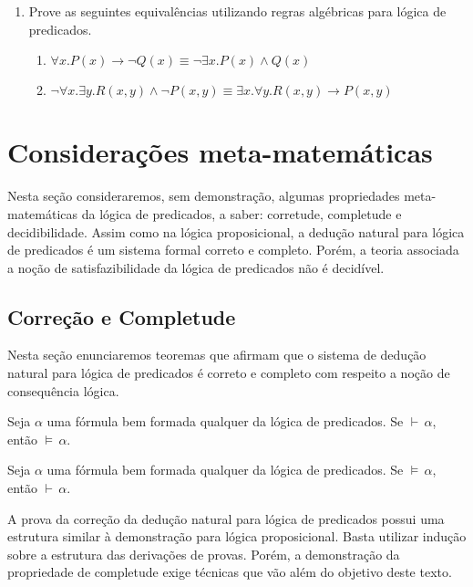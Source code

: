 \begin{enumerate}
         \item Prove as seguintes equival\^encias utilizando regras alg\'ebricas para l\'ogica de predicados.
         \begin{enumerate}
            \item $\forall x. P(x) \rightarrow \neg Q(x) \equiv \neg \exists x. P(x) \land Q(x)$
            \item $\neg \forall x.\exists y. R(x,y)\land \neg P(x,y)\equiv\exists x.\forall y.R(x,y)\rightarrow P(x,y)$
         \end{enumerate}
\end{enumerate}

\section{Considerações meta-matemáticas}

Nesta seção consideraremos, sem demonstração, algumas propriedades
meta-matemáticas da lógica de predicados, a saber: corretude,
completude e decidibilidade. Assim como na lógica proposicional, a
dedução natural para lógica de predicados é um sistema formal correto
e completo. Porém, a teoria associada a noção de satisfazibilidade da
lógica de predicados não é decidível.

\subsection{Correção e Completude}

Nesta seção enunciaremos teoremas que afirmam que o sistema de dedução
natural para lógica de predicados é correto e completo com respeito a
noção de consequência lógica.

\begin{Theorem}
Seja $\alpha$ uma fórmula bem formada qualquer da lógica
de predicados. Se $\vdash\,\alpha$, então $\models\,\alpha$.
\end{Theorem}

\begin{Theorem}
Seja $\alpha$ uma fórmula bem formada qualquer da lógica
de predicados. Se $\models\,\alpha$, então $\vdash\,\alpha$.
\end{Theorem}

A prova da correção da dedução natural para lógica de predicados
possui uma estrutura similar à demonstração para lógica
proposicional. Basta utilizar indução sobre a estrutura das derivações
de provas. Porém, a demonstração da propriedade de completude exige
técnicas que vão além do objetivo deste texto.

